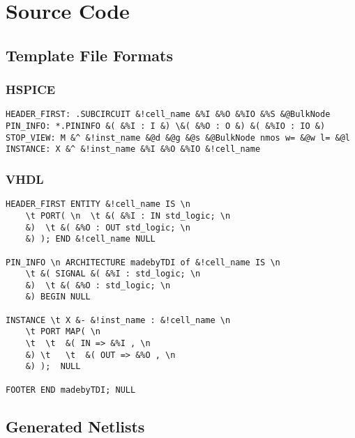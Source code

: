 %
%
%
%
%

\appendix
{}

\chapter{Source Code}
\section{Template File Formats}
\subsection{HSPICE}

\label{table:template_cdl}
{\footnotesize
\begin{verbatim}
HEADER_FIRST: .SUBCIRCUIT &!cell_name &%I &%O &%IO &%S &@BulkNode 
PIN_INFO: *.PININFO &( &%I : I &) \&( &%O : O &) &( &%IO : IO &) 
STOP_VIEW: M &^ &!inst_name &@d &@g &@s &@BulkNode nmos w= &@w l= &@l 
INSTANCE: X &^ &!inst_name &%I &%O &%IO &!cell_name
\end{verbatim}
}

\subsection{VHDL}

\label{table:template_vhdl}
{\footnotesize
\begin{verbatim}
HEADER_FIRST ENTITY &!cell_name IS \n
    \t PORT( \n  \t &( &%I : IN std_logic; \n
    &)  \t &( &%O : OUT std_logic; \n
    &) ); END &!cell_name NULL

PIN_INFO \n ARCHITECTURE madebyTDI of &!cell_name IS \n
    \t &( SIGNAL &( &%I : std_logic; \n
    &)  \t &( &%O : std_logic; \n
    &) BEGIN NULL

INSTANCE \t X &- &!inst_name : &!cell_name \n
    \t PORT MAP( \n
    \t  \t  &( IN => &%I , \n
    &) \t   \t  &( OUT => &%O , \n
    &) );  NULL

FOOTER END madebyTDI; NULL
\end{verbatim}
}

\section{Generated Netlists}

